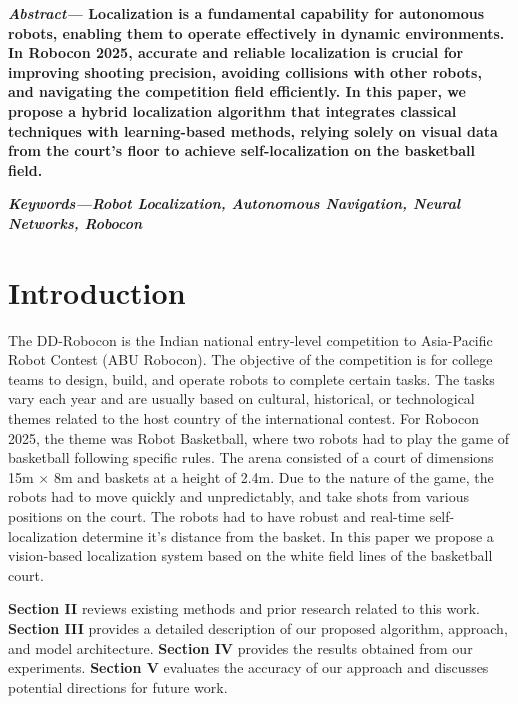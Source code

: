 \documentclass[a4paper]{article}
\begin{document}
\begin{multicols}{2}
\setlength{\columnsep}{0.5cm}

\noindent \textbf{\textit{Abstract---}
Localization is a fundamental capability for autonomous robots, enabling them 
to operate effectively in dynamic environments. In Robocon 2025, accurate and 
reliable localization is crucial for improving shooting precision, avoiding 
collisions with other robots, and navigating the competition field efficiently. 
In this paper, we propose a hybrid localization algorithm that integrates classical 
techniques with learning-based methods, relying solely on visual data from the court’s
floor to achieve self-localization on the basketball field.
}

\small	
\noindent \textbf{
  \textit{Keywords---}\textit{Robot Localization, Autonomous Navigation, Neural Networks, Robocon}}

\section{Introduction}
\par \noindent
The DD-Robocon is the Indian national entry-level competition to Asia-Pacific Robot Contest (ABU Robocon). The objective of the competition is for college teams to design, build, and operate robots to complete certain tasks. The tasks vary each year and are usually based on cultural, historical, or technological themes related to the host country of the international contest. For Robocon 2025, the theme was Robot Basketball, where two robots had to play the game of basketball following specific rules. The arena consisted of a court of dimensions 15m $\times$ 8m and baskets at a height of 2.4m. Due to the nature of the game, the robots had to move quickly and unpredictably, and take shots from various positions on the court. The robots had to have robust and real-time self-localization determine it's distance from the basket.
In this paper we propose a vision-based localization system based on the white field lines of the basketball court.

\par \noindent
\textbf{Section II} reviews existing methods and prior research related to this work. 
\textbf{Section III} provides a detailed description of our proposed algorithm, approach, and model architecture. 
\textbf{Section IV} provides the results obtained from our experiments. 
\textbf{Section V} evaluates the accuracy of our approach and discusses potential directions for future work.



\end{multicols}
\end{document}
